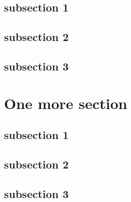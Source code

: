 \documentclass[9pt]{beamer}
\begin{document}
\subsection{subsection 1}
\subsection{subsection 2}
\subsection{subsection 3}
\section{One more section}
\subsection{subsection 1}
\subsection{subsection 2}
\subsection{subsection 3}


\end{document}
